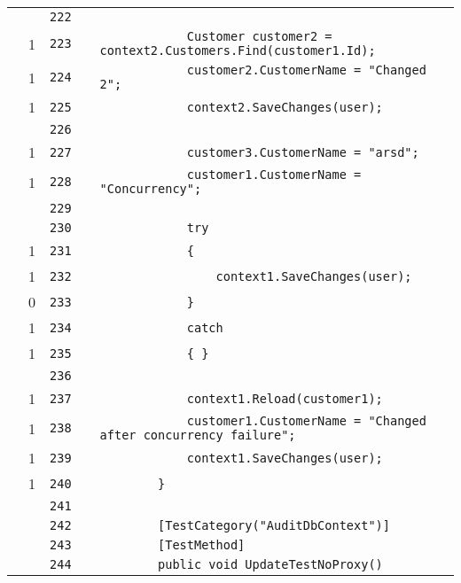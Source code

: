 \documentclass[a4paper,10pt]{article}
\begin{document}
\begin{longtable}[l]{lrrll}
\cellcolor{gray} &  & \verb~222~ & & \verb~~\\
\cellcolor{green} & 1 & \verb~223~ & & \verb~            Customer customer2 = context2.Customers.Find(customer1.Id);~\\
\cellcolor{green} & 1 & \verb~224~ & & \verb~            customer2.CustomerName = "Changed 2";~\\
\cellcolor{green} & 1 & \verb~225~ & & \verb~            context2.SaveChanges(user);~\\
\cellcolor{gray} &  & \verb~226~ & & \verb~~\\
\cellcolor{green} & 1 & \verb~227~ & & \verb~            customer3.CustomerName = "arsd";~\\
\cellcolor{green} & 1 & \verb~228~ & & \verb~            customer1.CustomerName = "Concurrency";~\\
\cellcolor{gray} &  & \verb~229~ & & \verb~~\\
\cellcolor{gray} &  & \verb~230~ & & \verb~            try~\\
\cellcolor{green} & 1 & \verb~231~ & & \verb~            {~\\
\cellcolor{green} & 1 & \verb~232~ & & \verb~                context1.SaveChanges(user);~\\
\cellcolor{red} & 0 & \verb~233~ & & \verb~            }~\\
\cellcolor{green} & 1 & \verb~234~ & & \verb~            catch~\\
\cellcolor{green} & 1 & \verb~235~ & & \verb~            { }~\\
\cellcolor{gray} &  & \verb~236~ & & \verb~~\\
\cellcolor{green} & 1 & \verb~237~ & & \verb~            context1.Reload(customer1);~\\
\cellcolor{green} & 1 & \verb~238~ & & \verb~            customer1.CustomerName = "Changed after concurrency failure";~\\
\cellcolor{green} & 1 & \verb~239~ & & \verb~            context1.SaveChanges(user);~\\
\cellcolor{green} & 1 & \verb~240~ & & \verb~        }~\\
\cellcolor{gray} &  & \verb~241~ & & \verb~~\\
\cellcolor{gray} &  & \verb~242~ & & \verb~        [TestCategory("AuditDbContext")]~\\
\cellcolor{gray} &  & \verb~243~ & & \verb~        [TestMethod]~\\
\cellcolor{gray} &  & \verb~244~ & & \verb~        public void UpdateTestNoProxy()~\\

\end{longtable}
\end{document}
